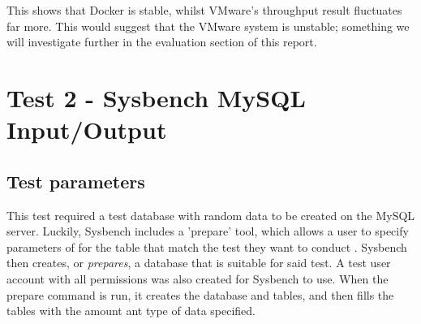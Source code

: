 \begin{figure}[H]
\caption{}
\label{fig:test1graphs}
\centering
\end{figure}

This shows that Docker is stable, whilst VMware's throughput result fluctuates far more. This would suggest that the VMware system is unstable; something we will investigate further in the evaluation section of this report.

\section{Test 2 - Sysbench MySQL Input/Output}
\label{sec:Test2}
\subsection{Test parameters}
This test required a test database with random data to be created on the MySQL server. Luckily, Sysbench includes a 'prepare' tool, which allows a user to specify parameters of for the table that match the test they want to conduct \citep{sysbench}. Sysbench then creates, or \emph{prepares}, a database that is suitable for said test. A test user account with all permissions was also created for Sysbench to use. When the prepare command is run, it creates the database and tables, and then fills the tables with the amount ant type of data specified.

